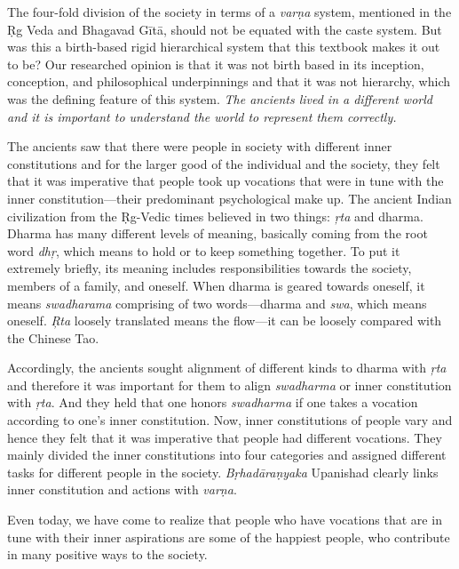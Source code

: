 The four-fold division of the society in terms of a \textit{varṇa} system, mentioned in the Ṛg Veda and Bhagavad Gītā, should not be equated with the caste system. But was this a birth-based rigid hierarchical system that this textbook makes it out to be? Our researched opinion is that it was not birth based in its inception, conception, and philosophical underpinnings and that it was not hierarchy, which was the defining feature of this system. \textit{The ancients lived in a different world and it is important to understand the world to represent them correctly.} 
\vskip 3.2pt

The ancients saw that there were people in society with different inner constitutions and for the larger good of the individual and the society, they felt that it was imperative that people took up vocations that were in tune with the inner constitution—their predominant psychological make up. The ancient Indian civilization from the Ṛg-Vedic times believed in two things: \textit{ŗta} and dharma. Dharma has many different levels of meaning, basically coming from the root word \textit{dhŗ},  which means to hold or to keep something together. To put it extremely briefly, its meaning includes responsibilities towards the society, members of a family, and oneself. When dharma is geared towards oneself, it means \textit{swadharama} comprising of two words—dharma and \textit{swa},  which means oneself. \textit{Ŗta} loosely translated means the flow—it can be loosely compared with the Chinese Tao. 
\vskip 3.2pt

Accordingly, the ancients sought alignment of different kinds to dharma with \textit{ŗta} and therefore it was important for them to align \textit{swadharma} or inner constitution with \textit{ŗta}. And they held that one honors \textit{swadharma} if one takes a vocation according to one’s inner constitution. Now, inner constitutions of people vary and hence they felt that it was imperative that people had different vocations. They mainly divided the inner constitutions into four categories and assigned different tasks for different people in the society. \textit{Bṛhadāraṇyaka} Upanishad clearly links inner constitution and actions with \textit{varṇa}. 

Even today, we have come to realize that people who have vocations that are in tune with their inner aspirations are some of the happiest people, who contribute in many positive ways to the society. 


